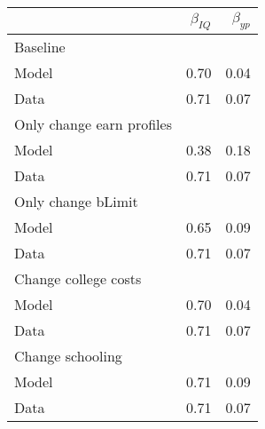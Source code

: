 \begin{tabular}{lrr}
\hline
  & $\beta_{IQ}$  & $\beta_{yp}$  \\ 
\hline
Baseline &   &   \\ 
Model & 0.70  & 0.04  \\ 
Data & 0.71  & 0.07  \\ 
Only change earn profiles &   &   \\ 
Model & 0.38  & 0.18  \\ 
Data & 0.71  & 0.07  \\ 
Only change bLimit &   &   \\ 
Model & 0.65  & 0.09  \\ 
Data & 0.71  & 0.07  \\ 
Change college costs &   &   \\ 
Model & 0.70  & 0.04  \\ 
Data & 0.71  & 0.07  \\ 
Change schooling &   &   \\ 
Model & 0.71  & 0.09  \\ 
Data & 0.71  & 0.07  \\ 
\hline
\end{tabular}%
